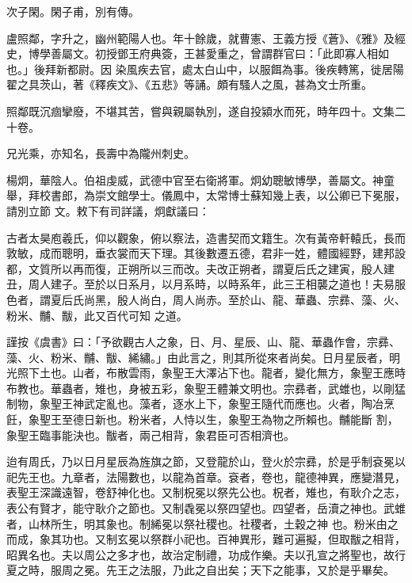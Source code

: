 \begin{pinyinscope}
 次子閑。閑子甫，別有傳。



 盧照鄰，字升之，幽州範陽人也。年十餘歲，就曹憲、王義方授《蒼》、《雅》及經史，博學善屬文。初授鄧王府典簽，王甚愛重之，曾謂群官曰：「此即寡人相如也。」後拜新都尉。因
 染風疾去官，處太白山中，以服餌為事。後疾轉篤，徙居陽翟之具茨山，著《釋疾文》、《五悲》等誦。頗有騷人之風，甚為文士所重。



 照鄰既沉痼攣廢，不堪其苦，嘗與親屬執別，遂自投潁水而死，時年四十。文集二十卷。



 兄光乘，亦知名，長壽中為隴州刺史。



 楊炯，華陰人。伯祖虔威，武德中官至右衛將軍。炯幼聰敏博學，善屬文。神童舉，拜校書郎，為崇文館學士。儀鳳中，太常博士蘇知幾上表，以公卿已下冕服，請別立節
 文。敕下有司詳議，炯獻議曰：



 古者太昊庖羲氏，仰以觀象，俯以察法，造書契而文籍生。次有黃帝軒轅氏，長而敦敏，成而聰明，垂衣裳而天下理。其後數遷五德，君非一姓，體國經野，建邦設都，文質所以再而復，正朔所以三而改。夫改正朔者，謂夏后氏之建寅，殷人建丑，周人建子。至於以日系月，以月系時，以時系年，此三王相襲之道也！夫易服色者，謂夏后氏尚黑，殷人尚白，周人尚赤。至於山、龍、華蟲、宗彞、藻、火、粉米、黼、黻，此又百代可知
 之道。



 謹按《虞書》曰：「予欲觀古人之象，日、月、星辰、山、龍、華蟲作會，宗彞、藻、火、粉米、黼、黻、絺繡。」由此言之，則其所從來者尚矣。日月星辰者，明光照下土也。山者，布散雲雨，象聖王大澤沾下也。龍者，變化無方，象聖王應時布教也。華蟲者，雉也，身被五彩，象聖王體兼文明也。宗彞者，武蜼也，以剛猛制物，象聖王神武定亂也。藻者，逐水上下，象聖王隨代而應也。火者，陶冶烹飪，象聖王至德日新也。粉米者，人恃以生，象聖王為物之所賴也。黼能斷
 割，象聖王臨事能決也。黻者，兩己相背，象君臣可否相濟也。



 迨有周氏，乃以日月星辰為旌旗之節，又登龍於山，登火於宗彞，於是乎制袞冕以祀先王也。九章者，法陽數也，以龍為首章。袞者，卷也，龍德神異，應變潛見，表聖王深識遠智，卷舒神化也。又制柷冕以祭先公也。柷者，雉也，有耿介之志，表公有賢才，能守耿介之節也。又制毳冕以祭四望也。四望者，岳瀆之神也。武蜼者，山林所生，明其象也。制絺冕以祭社稷也。社稷者，土穀之神
 也。粉米由之而成，象其功也。又制玄冕以祭群小祀也。百神異形，難可遍擬，但取黻之相背，昭異名也。夫以周公之多才也，故治定制禮，功成作樂。夫以孔宣之將聖也，故行夏之時，服周之冕。先王之法服，乃此之自出矣；天下之能事，又於是乎畢矣。




\end{pinyinscope}
